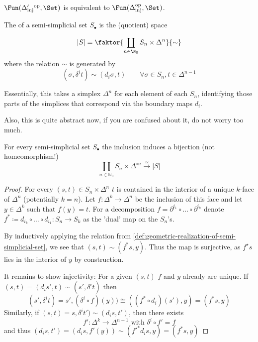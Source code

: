 \begin{remark}
    $\Fun(\Delta_{\text{inj}}'{}^{\text{op}}, \Set)$ is equivalent to $\Fun(\Delta_\text{inj}^{\text{op}}, \Set)$.
\end{remark}

\begin{definition}\label{def:geometric-realization-of-semi-simplicial-set}
    The  of a semi-simplicial set $S_{\bullet}$ is the (quotient) space 
    
    \[
        |S| = \faktor{\coprod\limits_{n \in  \N_0} S_n \times \Delta^n}{\sim}
    \]
    where the relation $\sim $ is generated by 
    \[
        (\sigma, \delta^i t) \sim (d_i \sigma, t) \qquad \forall \sigma \in  S_n, t \in  \Delta^{n-1}
    \]
\end{definition}

\begin{oral}
    Essentially, this takes a simplex $\Delta^n$ for each element of each  $S_n$, identifying those parts of the simplices that correspond via the boundary maps  $d_i$.

    Also, this is quite abstract now, if you are confused about it, do not worry too much.
\end{oral}

\begin{lemma}\label{lm:bijection-between-interiors-of-simplices-and-realization-of-semi-simplicial-complex}
    For every semi-simplicial set $S_\bullet$ the inclusion induces a bijection (not homeomorphism!) 
    \[
    \coprod_{n \in  \mathbb{N}_0} S_n \times \Delta^{\circ n} \stackrel{\simeq}{\longrightarrow}   | S|
    \] 
\end{lemma}

\begin{proof}
    For every $(s,t) \in  S_n \times  \Delta^n$ $t$ is contained in the interior of a unique  $k$-face of $\Delta^n$ (potentially $k=n$).
    Let $f: \Delta^k \to  \Delta^n$ be the inclusion of this face and let $y \in \Delta^k$ such that $f(y) = t$. 
    For a decomposition $f = \partial^{i_1} \circ \ldots \circ \partial^{i_k}$ denote $f^{\ast} \coloneqq d_{i_k} \circ \ldots \circ d_{i_1} : S_n \to  S_k$ as the 'dual' map on the $S_n$'s.

    By inductively applying the relation from \autoref{def:geometric-realization-of-semi-simplicial-set}, we see that $(s,t) \sim (f^\ast s , y)$. Thus the map is surjective, as $f^{\star}s$ lies in the interior of $y$ by construction.

    It remains to show injectivity: For a given $(s,t)$ $f$ and $y$ already are unique.
    If $(s,t) = (d_i s',t) \sim  (s', \delta^i t)$ then 
    \[
        (s', \delta^i t) = s', (\delta^i \circ f)(y)) \cong ((f^\ast \circ d_i)(s'), y) = (f^\ast s, y)
    \]
    Similarly, if $(s,t) = s, \delta^i t') \sim  (d_i s, t')$, then there exists 
    \[
        f': \Delta^k \to  \Delta^{n-1} \text{ with } \delta^i \circ f' = f
    \]
    and thus  $(d_i s, t') = (d_i s, f'(y)) \sim ({f'}^\ast d_i s, y) = (f^\ast s,y)$
\end{proof}

